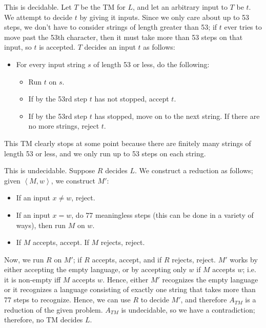 \documentclass[solution, letterpaper]{cs121}
\begin{document}
\begin{solution}
\subsolution This is decidable.  Let $T$ be the TM for $L$, and let an arbitrary input to $T$ be $t$.  We attempt to decide $t$ by giving it inputs.  Since we only care about up to 53 steps, we don't have to consider strings of length greater than 53; if $t$ ever tries to move past the 53th character, then it must take more than 53 steps on that input, so $t$ is accepted.  $T$ decides an input $t$ as follows:
\begin{itemize}
	\setlength\itemsep{0cm}
	\item For every input string $s$ of length 53 or less, do the following:
	\begin{itemize}
		\item Run $t$ on $s$.
		\item If by the 53rd step $t$ has not stopped, accept $t$.
		\item If by the 53rd step $t$ has stopped, move on to the next string.  If there are no more strings, reject $t$.
	\end{itemize}
\end{itemize}

This TM clearly stops at some point because there are finitely many strings of length 53 or less, and we only run up to 53 steps on each string.

\subsolution This is undecidable.  Suppose $R$ decides $L$.  We construct a reduction as follows; given $\left<M, w\right >$, we construct $M'$:
\begin{itemize}
	\setlength\itemsep{0cm}
	\item If an input $x \neq w$, reject.
	\item If an input $x = w$, do 77 meaningless steps (this can be done in a variety of ways), then run $M$ on $w$.
	\item If $M$ accepts, accept.  If $M$ rejects, reject.
\end{itemize}

Now, we run $R$ on $M'$; if $R$ accepts, accept, and if $R$ rejects, reject.  $M'$ works by either accepting the empty language, or by accepting only $w$ if $M$ accepts $w$; i.e. it is non-empty iff $M$ accepts $w$.  Hence, either $M'$ recognizes the empty language or it recognizes a language consisting of exactly one string that takes more than 77 steps to recognize.  Hence, we can use $R$ to decide $M'$, and therefore $A_{TM}$ is a reduction of the given problem.  $A_{TM}$ is undecidable, so we have a contradiction; therefore, no TM decides $L$.


\end{solution}
\end{document}
